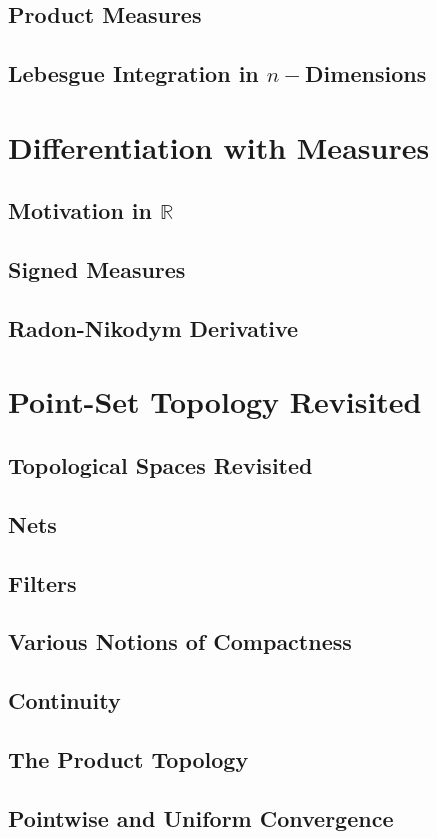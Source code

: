 \documentclass{article}
\newcommand{\R}{\mathbb{R}}
\theoremstyle{definition}
\begin{document}
\subsection{Product Measures}
\subsection{Lebesgue Integration in $ n- $Dimensions}
\section{Differentiation with Measures}
\subsection{Motivation in $ \R $}
\subsection{Signed Measures}
\subsection{Radon-Nikodym Derivative}
\section{Point-Set Topology Revisited}
\subsection{Topological Spaces Revisited}
\subsection{Nets}
\subsection{Filters}
\subsection{Various Notions of Compactness}
\subsection{Continuity}
\subsection{The Product Topology}
\subsection{Pointwise and Uniform Convergence}
\end{document}
